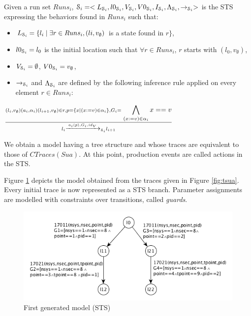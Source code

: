\begin{definition}
  Given a run set $Runs_i$, $\EuScript{S}_i=<L_{\EuScript{S}_i},
  l0_{\EuScript{S}_i},V_{\EuScript{S}_i}, V0_{\EuScript{S}_i},
  I_{\EuScript{S}_i},\\
  \Lambda_{\EuScript{S}_i},\rightarrow_{\EuScript{S}_i}>$ is the
  STS expressing the behaviors found in $Runs_i$ such that:

	\begin{itemize}
    \item $L_{\EuScript{S}_i}= \{l_i \mid \exists r\in Runs_i,
      (li,v_\emptyset)$ is a state found in $r\}$,

    \item $l0_{\EuScript{S}_i} = l_0$ is the initial location
      such that $\forall r \in Runs_i$, $r$ starts with
      $(l_0,v_\emptyset)$,

    \item $V_{\EuScript{S}_i}=\emptyset$,
      $V0_{\EuScript{S}_i}=v_\emptyset$,

    \item $\rightarrow_{\EuScript{S}_i}$ and
      $\Lambda_{\EuScript{S}_i}$ are defined by the following
      inference rule applied on every element $r\in Runs_i$:
	\end{itemize}

  \begin{center}
    $\frac{(l_i,v_\emptyset) (a_i,\alpha_i) (l_{i+1},v_\emptyset)
    \in r, p=\{x \mid (x:=v)\in \alpha_i \}, G_i=\displaystyle
  \bigwedge_{(x:=v)\in \alpha_i}x==v}{l_i \xrightarrow{a_i(p),G_i,id_V}_{\EuScript{S}_i} l_{i+1}}$
  \end{center}


  \label{IOSTS_tree}
\end{definition}

We obtain a model having a tree structure and whose traces are
equivalent to those of $CTraces(Sua)$. At this point, production
events are called actions in the STS.

Figure \ref{fig:firstmodel} depicts the model obtained from the
traces given in Figure \ref{fig:tsua}. Every initial trace is now
represented as a STS branch. Parameter assignments are modelled
with constraints over transitions, called \textit{guards}.

\begin{figure}[ht]
  \includegraphics[width=1.0\linewidth]{figures/STS1.png}

  \caption{First generated model (STS)}
  \label{fig:firstmodel}
\end{figure}

